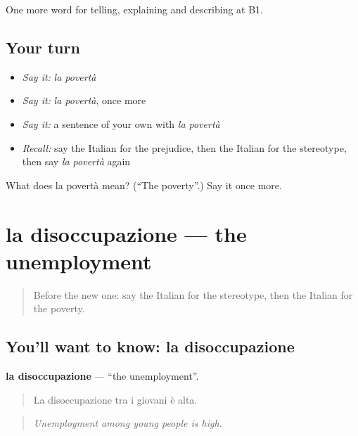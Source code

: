 \begin{grammarlens}[title={What you've built}]
One more word for telling, explaining and describing at B1.
\end{grammarlens}

\subsection*{Your turn}
\begin{itemize}
\raggedright
  \item \emph{Say it:} \emph{la povertà}
  \item \emph{Say it:} \emph{la povertà}, once more
  \item \emph{Say it:} a sentence of your own with \emph{la povertà}
  \item \emph{Recall:} say the Italian for the prejudice, then the Italian for the stereotype, then say \emph{la povertà} again
\end{itemize}

\begin{tcolorbox}[breakable,colback=teal!4,colframe=teal!35!black,title={Before you move on}]
What does la povertà mean? (\textquotedblleft{}The poverty\textquotedblright{}.) Say it once more.
\end{tcolorbox}
\section[la disoccupazione]{la disoccupazione — the unemployment}

\label{lesson:IT-C366-disoccupazione}



\begin{quote}
Before the new one: say the Italian for the stereotype, then the Italian for the poverty.
\end{quote}

\subsection*{You'll want to know: la disoccupazione}
\textbf{la disoccupazione} — \textquotedblleft{}the unemployment\textquotedblright{}.

\begin{quote}
La disoccupazione tra i giovani è alta.
\end{quote}

\begin{quote}
\emph{Unemployment among young people is high.}
\end{quote}

